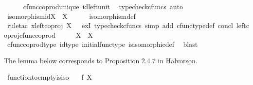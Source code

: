 \begin{isabellebody}
\ \ \ \ \isamarkupfalse%
\ cfunc{\isacharunderscore}{\kern0pt}coprod{\isacharunderscore}{\kern0pt}unique\ id{\isacharunderscore}{\kern0pt}left{\isacharunderscore}{\kern0pt}unit{}\ \isamarkupfalse%
\ {\isacharparenleft}{\kern0pt}typecheck{\isacharunderscore}{\kern0pt}cfuncs{\isacharcomma}{\kern0pt}\ auto{\isacharparenright}{\kern0pt}\isanewline
\ \ \isamarkupfalse%
\ \isamarkupfalse%
\ {\isachardoublequoteopen}isomorphism{\isacharparenleft}{\kern0pt}id{\isacharparenleft}{\kern0pt}X{\isacharparenright}{\kern0pt}\ {\isasymamalg}\ {\isasymalpha}\isactrlbsub X\isactrlesub {\isacharparenright}{\kern0pt}{\isachardoublequoteclose}\isanewline
\ \ \ \ \isamarkupfalse%
\ isomorphism{\isacharunderscore}{\kern0pt}def\ \isanewline
\ \ \ \ \isamarkupfalse%
\ {\isacharparenleft}{\kern0pt}rule{\isacharunderscore}{\kern0pt}tac\ x{\isacharequal}{\kern0pt}{\isachardoublequoteopen}left{\isacharunderscore}{\kern0pt}coproj\ X\ {\isasymemptyset}{\isachardoublequoteclose}\ \ exI{\isacharcomma}{\kern0pt}\ typecheck{\isacharunderscore}{\kern0pt}cfuncs{\isacharcomma}{\kern0pt}\ simp\ add{\isacharcolon}{\kern0pt}\ cfunc{\isacharunderscore}{\kern0pt}type{\isacharunderscore}{\kern0pt}def\ concl\ left{\isacharunderscore}{\kern0pt}coproj{\isacharunderscore}{\kern0pt}cfunc{\isacharunderscore}{\kern0pt}coprod{\isacharparenright}{\kern0pt}\isanewline
\ \ \isamarkupfalse%
\ \isamarkupfalse%
\ {\isachardoublequoteopen}X{\isasymCoprod}{\isasymemptyset}\ {\isasymcong}\ X{\isachardoublequoteclose}\isanewline
\ \ \ \ \isamarkupfalse%
\ cfunc{\isacharunderscore}{\kern0pt}coprod{\isacharunderscore}{\kern0pt}type\ id{\isacharunderscore}{\kern0pt}type\ initial{\isacharunderscore}{\kern0pt}func{\isacharunderscore}{\kern0pt}type\ is{\isacharunderscore}{\kern0pt}isomorphic{\isacharunderscore}{\kern0pt}def\ \isamarkupfalse%
\ blast\isanewline
{}\isamarkupfalse%
%
\endisatagproof
{\isafoldproof}%
%
\isadelimproof
%
\endisadelimproof
%
\begin{isamarkuptext}%
The lemma below corresponds to Proposition 2.4.7 in Halvorson.%
\end{isamarkuptext}\isamarkuptrue%
\isamarkupfalse%
\ function{\isacharunderscore}{\kern0pt}to{\isacharunderscore}{\kern0pt}empty{\isacharunderscore}{\kern0pt}is{\isacharunderscore}{\kern0pt}iso{\isacharcolon}{\kern0pt}\isanewline
\ \ \ {\isachardoublequoteopen}f{\isacharcolon}{\kern0pt}\ X\ {\isasymrightarrow}\ {\isasymemptyset}{\isachardoublequoteclose}\isanewline

\end{isabellebody}

